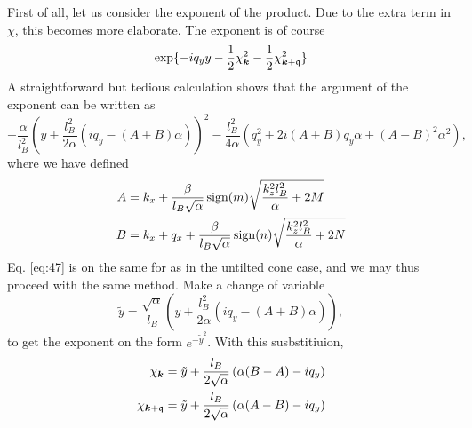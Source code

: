 First of all, let us consider the exponent of the product.
Due to the extra term in \(\chi\), this becomes more elaborate.
The exponent is of course
\begin{equation}
  \label{eq:46}
  \exp\{-i q_{y} y - \frac{1}{2} \chi_{\bm{k}} ^2 - \frac{1}{2} \chi _{\bm{k} + \mathfrak{q}}^2\}
\end{equation}
A straightforward but tedious calculation shows that the argument of the exponent can be written as
\begin{equation}
  \label{eq:47}
  -\frac{\alpha}{l_{B}^2} \left(y + \frac{l_{B}^2}{2 \alpha } (i q_{y} - (A+B)\alpha)\right)^2
  -\frac{l_{B}^2}{4 \alpha } (q_{y}^2 + 2i (A+B) q_{y} \alpha + (A-B)^2 \alpha^2),
\end{equation}
where we have defined
\begin{align}
  A &= k_{x} + \frac{\beta}{l_{B} \sqrt{\alpha }} \operatorname{sign}(m) \sqrt{\frac{k_{z}^2l_{B}^2}{\alpha } + 2 M}\\
  B &= k_{x} + q_{x} + \frac{\beta}{l_{B} \sqrt{\alpha }} \operatorname{sign}(n) \sqrt{\frac{k_{z}^2l_{B}^2}{\alpha } + 2 N}
\end{align}
Eq. \eqref{eq:47} is on the same for as in the untilted cone case, and we may thus proceed with the same method.
Make a change of variable
\[
\tilde{y} = \frac{\sqrt{\alpha }}{l_{B}} \left(y + \frac{l_{B}^2}{2\alpha } (iq_{y} - (A+B) \alpha)\right),
\]
to get the exponent on the form \(e^{-\tilde{y}^2}\).
With this susbstitiuion,
\begin{align}
  \chi _{\bm{k}} &= \tilde{y} + \frac{l_{B}}{2 \sqrt{\alpha }} \left(\alpha (B-A) - i q_{y}\right)\\
  \chi _{\bm{k} + \mathfrak{q}} &= \tilde{y} + \frac{l_{B}}{2 \sqrt{\alpha }} \left(\alpha (A-B) - i q_{y}\right)
\end{align}

